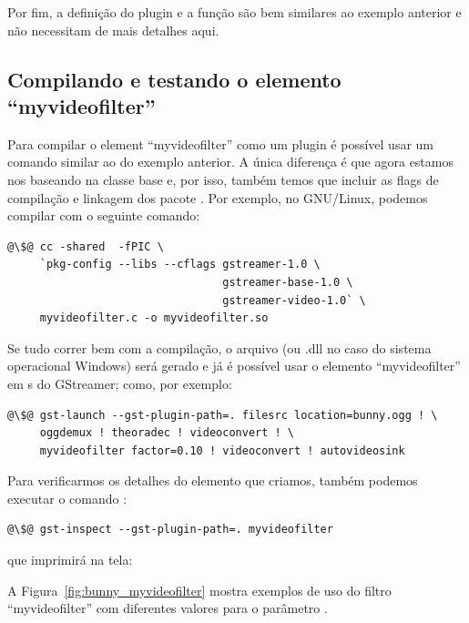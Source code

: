 Por fim, a definição do plugin e a função  são bem
similares ao exemplo anterior e não necessitam de mais detalhes aqui.

\subsection*{Compilando e testando o elemento ``myvideofilter''}
Para compilar o element ``myvideofilter'' como um plugin é possível usar um
comando similar ao do exemplo anterior.  A única diferença é que agora estamos
nos baseando na classe base  e, por isso, também temos que
incluir as flags de compilação e linkagem dos pacote .
Por exemplo, no GNU/Linux, podemos compilar com o seguinte comando:

\begin{lstlisting}[style=command]
@\$@ cc -shared  -fPIC \
     `pkg-config --libs --cflags gstreamer-1.0 \
                                 gstreamer-base-1.0 \
                                 gstreamer-video-1.0` \
     myvideofilter.c -o myvideofilter.so
\end{lstlisting}

Se tudo correr bem com a compilação, o arquivo  (ou .dll no
caso do sistema operacional Windows) será gerado e já é possível usar o
elemento ``myvideofilter'' em s do GStreamer; como, por exemplo:
\begin{lstlisting}[style=command]
@\$@ gst-launch --gst-plugin-path=. filesrc location=bunny.ogg ! \
     oggdemux ! theoradec ! videoconvert ! \
     myvideofilter factor=0.10 ! videoconvert ! autovideosink
\end{lstlisting}

Para verificarmos os detalhes do elemento que criamos, também podemos executar
o comando \C{gst-inspect}: 
\begin{lstlisting}[style=command]
@\$@ gst-inspect --gst-plugin-path=. myvideofilter
\end{lstlisting}
que imprimirá na tela:



A Figura~\ref{fig:bunny_myvideofilter} mostra exemplos de uso do filtro
``myvideofilter'' com diferentes valores para o parâmetro .

